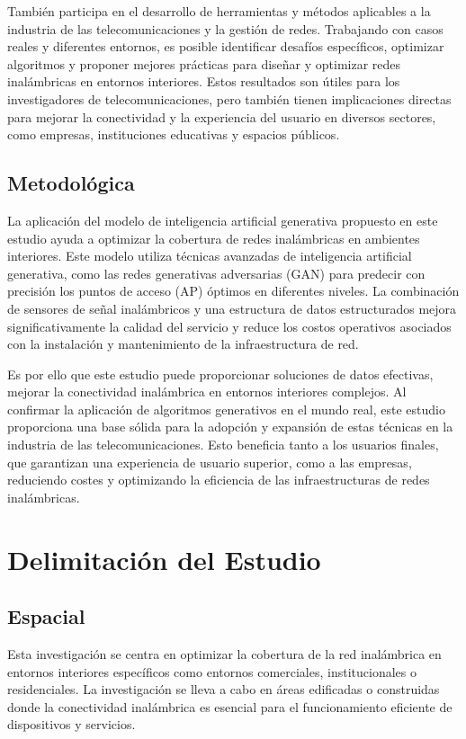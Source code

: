 También participa en el desarrollo de herramientas y métodos aplicables a la industria de las telecomunicaciones y la gestión de redes. Trabajando con casos reales y diferentes entornos, es posible identificar desafíos específicos, optimizar algoritmos y proponer mejores prácticas para diseñar y optimizar redes inalámbricas en entornos interiores. Estos resultados son útiles para los investigadores de telecomunicaciones, pero también tienen implicaciones directas para mejorar la conectividad y la experiencia del usuario en diversos sectores, como empresas, instituciones educativas y espacios públicos.

\subsection{Metodológica}
La aplicación del modelo de inteligencia artificial generativa propuesto en este estudio ayuda a optimizar la cobertura de redes inalámbricas en ambientes interiores. Este modelo utiliza técnicas avanzadas de inteligencia artificial generativa, como las redes generativas adversarias (GAN) para predecir con precisión los puntos de acceso (AP) óptimos en diferentes niveles. La combinación de sensores de señal inalámbricos y una estructura de datos estructurados mejora significativamente la calidad del servicio y reduce los costos operativos asociados con la instalación y mantenimiento de la infraestructura de red.

Es por ello que este estudio puede proporcionar soluciones de datos efectivas, mejorar la conectividad inalámbrica en entornos interiores complejos. Al confirmar la aplicación de algoritmos generativos en el mundo real, este estudio proporciona una base sólida para la adopción y expansión de estas técnicas en la industria de las telecomunicaciones. Esto beneficia tanto a los usuarios finales, que garantizan una experiencia de usuario superior, como a las empresas, reduciendo costes y optimizando la eficiencia de las infraestructuras de redes inalámbricas.

\section{Delimitación del Estudio}

\subsection{Espacial}
Esta investigación se centra en optimizar la cobertura de la red inalámbrica en entornos interiores específicos como entornos comerciales, institucionales o residenciales. La investigación se lleva a cabo en áreas edificadas o construidas donde la conectividad inalámbrica es esencial para el funcionamiento eficiente de dispositivos y servicios. 

